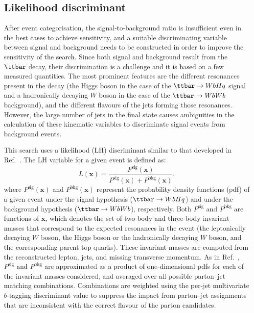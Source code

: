 \subsection{Likelihood discriminant}
\label{sec:likelihood_discriminant}

After event categorisation, the signal-to-background ratio is insufficient even in the best cases to achieve sensitivity, and a suitable
discriminating variable between signal and background needs to be constructed in order to improve the sensitivity of the search.
Since both signal and background result from the $\ttbar$ decay, 
their discrimination is a challenge and it is based on a few measured quantities.  
The most prominent features are the different resonances present in the decay (the Higgs boson in the case 
of the $\Hq$ signal and a hadronically decaying $W$ boson in the case of the $\ttbar \to WbWb$ background), and the different flavours of the 
jets forming those resonances. However, the large number of jets in the final state causes ambiguities in the calculation 
of these kinematic variables to discriminate signal events from background events. 

This search uses a likelihood (LH) discriminant similar to that developed in Ref.~\cite{Aad:2015pja}.
The LH variable for a given event is defined as:
\begin{equation*}
L(\mathbf{x}) = \frac{P^\textrm{sig}(\mathbf{x}) }{P^\textrm{sig}(\mathbf{x}) +P^\textrm{bkg}(\mathbf{x}) },
\label{eq:D}
\end{equation*}
where $P^\textrm{sig}(\mathbf{x}) $ and $P^\textrm{bkg}(\mathbf{x}) $ represent the probability density functions (pdf) of a given event under
the signal hypothesis ($\ttbar \to WbHq$) and under the background hypothesis ($\ttbar \to WbWb$), respectively.
Both $P^\textrm{sig}$ and $P^\textrm{bkg}$ are functions of $\mathbf{x}$, which denotes the set of two-body and three-body invariant masses 
that correspond to the expected resonances in the event (the leptonically decaying $W$ boson, the Higgs boson or the hadronically 
decaying $W$ boson, and the corresponding parent top quarks). These invariant masses are computed from the reconstructed 
lepton, jets, and missing transverse momentum.
As in Ref.~\cite{Aad:2015pja}, $P^\textrm{sig}$ and $P^\textrm{bkg}$ are approximated as a product of one-dimensional pdfs for
each of the invariant masses considered, and averaged over all possible parton--jet matching combinations. 
Combinations are weighted using the per-jet multivariate $b$-tagging discriminant value to suppress the impact from 
parton--jet assignments that are inconsistent with the correct flavour of the parton candidates.


